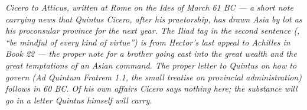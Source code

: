 
\textit{Cicero to Atticus, written at Rome on the Ides of
March 61 BC --- a short note carrying news that Quintus
Cicero, after his praetorship, has drawn Asia by lot as
his proconsular province for the next year. The
\textit{Iliad} tag in the second sentence
(, ``be mindful of every kind of virtue'')
is from Hector's last appeal to Achilles in Book 22 ---
the proper note for a brother going east into the great
wealth and the great temptations of an Asian command. The
proper letter to Quintus on how to govern (\textit{Ad
Quintum Fratrem} 1.1, the small treatise on provincial
administration) follows in 60 BC. Of his own affairs
Cicero says nothing here; the substance will go in a
letter Quintus himself will carry.}
